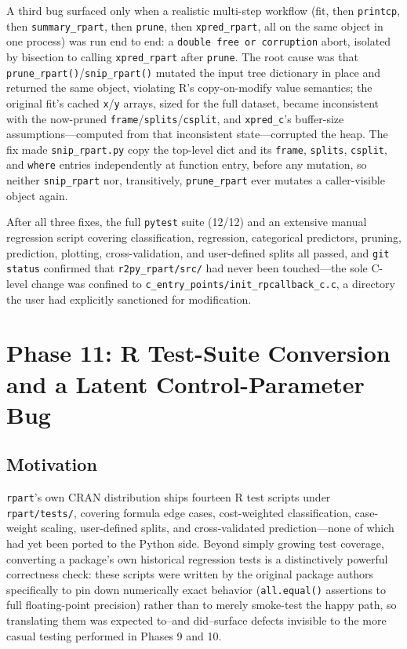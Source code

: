 \documentclass[12pt]{article}
\begin{document}
A third bug surfaced only when a realistic multi-step workflow (fit, then \texttt{printcp}, then \texttt{summary\_rpart}, then \texttt{prune}, then \texttt{xpred\_rpart}, all on the same object in one process) was run end to end: a \texttt{double free or corruption} abort, isolated by bisection to calling \texttt{xpred\_rpart} after \texttt{prune}. The root cause was that \texttt{prune\_rpart()}/\texttt{snip\_rpart()} mutated the input tree dictionary in place and returned the same object, violating R's copy-on-modify value semantics; the original fit's cached \texttt{x}/\texttt{y} arrays, sized for the full dataset, became inconsistent with the now-pruned \texttt{frame}/\texttt{splits}/\texttt{csplit}, and \texttt{xpred\_c}'s buffer-size assumptions---computed from that inconsistent state---corrupted the heap. The fix made \texttt{snip\_rpart.py} copy the top-level dict and its \texttt{frame}, \texttt{splits}, \texttt{csplit}, and \texttt{where} entries independently at function entry, before any mutation, so neither \texttt{snip\_rpart} nor, transitively, \texttt{prune\_rpart} ever mutates a caller-visible object again.

After all three fixes, the full \texttt{pytest} suite (12/12) and an extensive manual regression script covering classification, regression, categorical predictors, pruning, prediction, plotting, cross-validation, and user-defined splits all passed, and \texttt{git status} confirmed that \texttt{r2py\_rpart/src/} had never been touched---the sole C-level change was confined to \texttt{c\_entry\_points/init\_rpcallback\_c.c}, a directory the user had explicitly sanctioned for modification.

\section{Phase 11: R Test-Suite Conversion and a Latent Control-Parameter Bug}
\label{sec:phase11}

\subsection{Motivation}

\texttt{rpart}'s own CRAN distribution ships fourteen R test scripts under \texttt{rpart/tests/}, covering formula edge cases, cost-weighted classification, case-weight scaling, user-defined splits, and cross-validated prediction---none of which had yet been ported to the Python side. Beyond simply growing test coverage, converting a package's own historical regression tests is a distinctively powerful correctness check: these scripts were written by the original package authors specifically to pin down numerically exact behavior (\texttt{all.equal()} assertions to full floating-point precision) rather than to merely smoke-test the happy path, so translating them was expected to--and did--surface defects invisible to the more casual testing performed in Phases 9 and 10.
\end{document}
